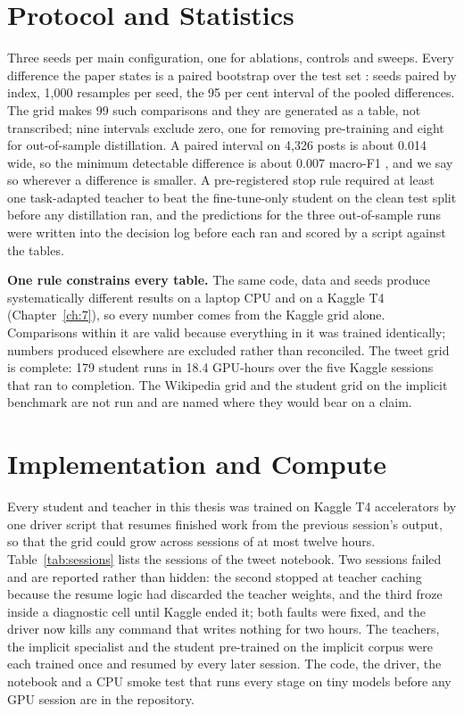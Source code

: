 \section{Protocol and Statistics}
\label{sec:4.7}
Three seeds per main configuration, one for ablations, controls and sweeps. Every difference the
paper states is a paired bootstrap over the test set \cite{koehn2004statistical,
dror2018hitchhiker}: seeds paired by index, 1,000 resamples per seed, the 95 per cent interval of
the pooled differences. The grid makes 99 such comparisons and they are generated as a table, not
transcribed; nine intervals exclude zero, one for removing pre-training and eight for out-of-sample
distillation. A paired interval on 4,326 posts is about 0.014 wide, so the minimum detectable
difference is about 0.007 macro-F1 \cite{card2020power}, and we say so wherever a difference is
smaller. A pre-registered stop rule required at least one task-adapted teacher to beat the
fine-tune-only student on the clean test split before any distillation ran, and the predictions for
the three out-of-sample runs were written into the decision log before each ran and scored by a
script against the tables.

\textbf{One rule constrains every table.} The same code, data and seeds produce systematically
different results on a laptop CPU and on a Kaggle T4 (Chapter~\ref{ch:7}), so every number comes
from the Kaggle grid alone. Comparisons within it are valid because everything in it was trained
identically; numbers produced elsewhere are excluded rather than reconciled. The tweet grid is
complete: 179 student runs in 18.4 GPU-hours over the five Kaggle sessions that ran to completion.
The Wikipedia grid and the student grid on the implicit benchmark are not run and are named where
they would bear on a claim.

\section{Implementation and Compute}
\label{sec:4.8}
Every student and teacher in this thesis was trained on Kaggle T4 accelerators by one driver script that
resumes finished work from the previous session's output, so that the grid could grow across sessions
of at most twelve hours. Table~\ref{tab:sessions} lists the sessions of the tweet notebook. Two sessions
failed and are reported rather than hidden: the second stopped at teacher caching because the resume
logic had discarded the teacher weights, and the third froze inside a diagnostic cell until Kaggle ended
it; both faults were fixed, and the driver now kills any command that writes nothing for two hours. The
teachers, the implicit specialist and the student pre-trained on the implicit corpus were each trained
once and resumed by every later session. The code, the driver, the notebook and a CPU smoke test that runs
every stage on tiny models before any GPU session are in the repository.


